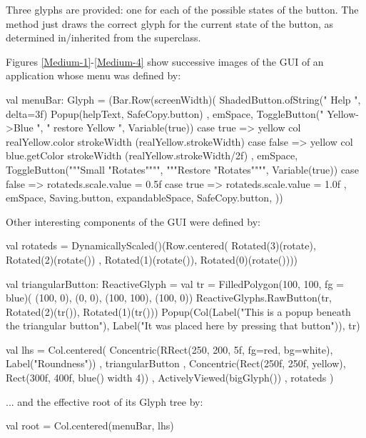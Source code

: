 Three glyphs are provided: one for each of the possible states of the button.
The  method just draws the correct glyph for the current state of the button,
as determined in/inherited from the superclass.
\begin{comment}
Because the glyphs may well be of different sizes, each must be drawn
at its own offset from the prigin of the button glyph; and these offsets are
calculated as the button is constructed.
\end{comment}

\clearpage
{}\label{anexample}

Figures \ref{Medium-1}-\ref{Medium-4} show successive images of
the GUI of an application whose menu was defined by:

\begin{scala}
 val menuBar: Glyph = (Bar.Row(screenWidth)(
   ShadedButton.ofString(" Help ", delta=3f) {
     Popup(helpText, SafeCopy.button)
   }, emSpace,
   ToggleButton(" Yellow->Blue ",  "  restore Yellow ", Variable(true)){
     case true  =>
          yellow col  realYellow.color strokeWidth  (realYellow.strokeWidth)
     case false =>
          yellow col  blue.getColor strokeWidth     (realYellow.strokeWidth/2f)
   }, emSpace,
   ToggleButton("""Small "Rotates"""", """Restore "Rotates"""", Variable(true)){
     case false => rotateds.scale.value = 0.5f
     case true  => rotateds.scale.value = 1.0f
   }, emSpace,
   Saving.button, expandableSpace,
   SafeCopy.button,
 ))
\end{scala}

Other interesting components of the GUI were defined by:

\begin{scala}
  val rotateds = DynamicallyScaled()(Row.centered(
      Rotated(3)(rotate),   Rotated(2)(rotate())
    , Rotated(1)(rotate()), Rotated(0)(rotate())))
    
  val  triangularButton: ReactiveGlyph = {
    val tr = FilledPolygon(100, 100, fg = blue)(
               (100, 0), (0, 0), (100, 100), (100, 0))
    ReactiveGlyphs.RawButton(tr, Rotated(2)(tr()), Rotated(1)(tr())) {
      Popup(Col(Label("This is a popup beneath the triangular button"),
                Label("It was placed here by pressing that button")), tr)
    }
  }

  val lhs = Col.centered(
      Concentric(RRect(250, 200, 5f, fg=red, bg=white), Label("Roundness"))
    , triangularButton
    , Concentric(Rect(250f, 250f, yellow), Rect(300f, 400f, blue() width 4))
    , ActivelyViewed(bigGlyph())
    , rotateds
  )
\end{scala}
... and the effective root of its Glyph tree by:
\begin{scala}
  val root = Col.centered(menuBar, lhs)
\end{scala}

